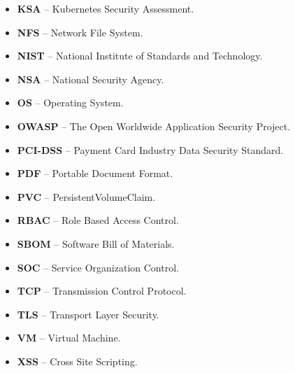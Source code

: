 \begin{itemize}
    \item \textbf{KSA} -- Kubernetes Security Assessment.
    \item \textbf{NFS} -- Network File System.
    \item \textbf{NIST} -- National Institute of Standards and Technology.
    \item \textbf{NSA} -- National Security Agency.
    \item \textbf{OS} -- Operating System.
    \item \textbf{OWASP} -- The Open Worldwide Application Security Project.
    \item \textbf{PCI-DSS} -- Payment Card Industry Data Security Standard.
    \item \textbf{PDF} -- Portable Document Format.
    \item \textbf{PVC} -- PersistentVolumeClaim.
    \item \textbf{RBAC} -- Role Based Access Control.
    \item \textbf{SBOM} -- Software Bill of Materials.
    \item \textbf{SOC} -- Service Organization Control.
    \item \textbf{TCP} -- Transmission Control Protocol.
    \item \textbf{TLS} -- Transport Layer Security.
    \item \textbf{VM} -- Virtual Machine.
    \item \textbf{XSS} -- Cross Site Scripting.    
\end{itemize}



